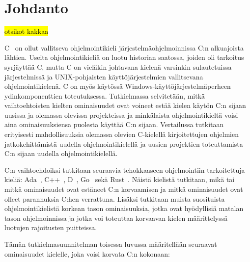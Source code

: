 \section{Johdanto} 

\hl{otsikot kakkaa}

C~\citep{C18} on ollut vallitseva ohjelmointikieli järjestelmäohjelmoinnissa
C:n alkuajoista lähtien. Useita ohjelmointikieliä on luotu historian saatossa,
joiden oli tarkoitus syrjäyttää C, mutta C on vieläkin johtavana kielenä
varsinkin sulautetuissa järjestelmissä ja UNIX-pohjaisten käyttöjärjestelmien
vallitsevana ohjelmointikielenä. C on myös käytössä
Windows-käyttöjärjestelmäperheen ydinkomponenttien toteutuksessa.
Tutkielmassa selvitetään, mitkä vaihtoehtoisten kielten ominaisuudet ovat
voineet estää kielen käytön C:n sijaan uusissa ja olemassa olevissa projekteissa
ja minkälaista ohjelmointikieltä voisi aina ominaisuuksiensa puolesta käyttää
C:n sijaan. Vertailussa tutkitaan erityisesti mahdollisuuksia olemassa olevien
C-kielellä kirjoitettujen ohjelmien jatkokehittämistä uudella
ohjelmointikielellä ja uusien projektien toteuttamista C:n sijaan uudella
ohjelmointikielellä.

C:n vaihtoehdoiksi tutkitaan seuraavia tehokkaaseen ohjelmointiin tarkoitettuja
kieliä: Ada~\citep{ADA12}, C++~\citep{CPP17}, D~\citep{D}, Go~\citep{golang}
sekä Rust~\citep{rust}. Näistä kielistä tutkitaan, mikä tai mitkä ominaisuudet
ovat estäneet C:n korvaamisen ja mitkä ominaisuudet ovat olleet parannuksia
C:hen verrattuna. Lisäksi tutkitaan muista suosituista ohjelmointikielistä
korkean tason ominaisuuksia, jotka ovat hyödyllisiä matalan tason
ohjelmoinnissa ja jotka voi toteuttaa korvaavan kielen määrittelyssä luotujen
rajoitusten puitteissa.


Tämän tutkielmasuunnitelman toisessa luvussa määritellään seuraavat
ominaisuudet kielelle, joka voisi korvata C:n kokonaan:

